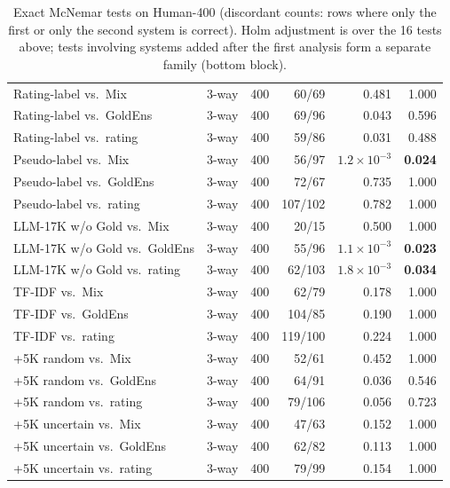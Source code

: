 \begin{table}[h]
\begin{tabular}{@{}llcrrr@{}}
Rating-label vs.\ Mix   & 3-way & 400 & 60/69  & 0.481 & 1.000 \\
Rating-label vs.\ GoldEns & 3-way & 400 & 69/96 & 0.043 & 0.596 \\
Rating-label vs.\ rating & 3-way & 400 & 59/86  & 0.031 & 0.488 \\
Pseudo-label vs.\ Mix   & 3-way & 400 & 56/97  & $1.2{\times}10^{-3}$ & \textbf{0.024} \\
Pseudo-label vs.\ GoldEns & 3-way & 400 & 72/67 & 0.735 & 1.000 \\
Pseudo-label vs.\ rating & 3-way & 400 & 107/102 & 0.782 & 1.000 \\
LLM-17K w/o Gold vs.\ Mix & 3-way & 400 & 20/15 & 0.500 & 1.000 \\
LLM-17K w/o Gold vs.\ GoldEns & 3-way & 400 & 55/96 & $1.1{\times}10^{-3}$ & \textbf{0.023} \\
LLM-17K w/o Gold vs.\ rating & 3-way & 400 & 62/103 & $1.8{\times}10^{-3}$ & \textbf{0.034} \\
TF-IDF vs.\ Mix           & 3-way & 400 & 62/79  & 0.178 & 1.000 \\
TF-IDF vs.\ GoldEns       & 3-way & 400 & 104/85 & 0.190 & 1.000 \\
TF-IDF vs.\ rating        & 3-way & 400 & 119/100 & 0.224 & 1.000 \\
+5K random vs.\ Mix       & 3-way & 400 & 52/61  & 0.452 & 1.000 \\
+5K random vs.\ GoldEns   & 3-way & 400 & 64/91  & 0.036 & 0.546 \\
+5K random vs.\ rating    & 3-way & 400 & 79/106 & 0.056 & 0.723 \\
+5K uncertain vs.\ Mix    & 3-way & 400 & 47/63  & 0.152 & 1.000 \\
+5K uncertain vs.\ GoldEns & 3-way & 400 & 62/82 & 0.113 & 1.000 \\
+5K uncertain vs.\ rating & 3-way & 400 & 79/99  & 0.154 & 1.000 \\
\bottomrule
\end{tabular}
\caption{Exact McNemar tests on Human-400 (discordant counts: rows
where only the first or only the second system is correct). Holm
adjustment is over the 16 tests above; tests involving systems added
after the first analysis form a separate family (bottom block).}
\label{tab:human400-stats}
\end{table}

